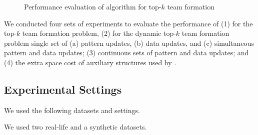 \begin{figure}[tb!]
\begin{center}
\hspace{0.2ex}
\vspace{-2.0ex}
\end{center}

\vspace{-3ex}
\caption{Performance evaluation of algorithm \optgrouprec for top-$k$ team formation}
\label{exp-semantic-effectiveness-citation}
\vspace{-3.0ex}
\end{figure}

We conducted four sets of experiments to evaluate the performance of
(1) \optgrouprec for the top-$k$ team formation problem,
(2) \inc for the dynamic top-$k$ team formation problem
\wrt single set of (a) pattern updates, (b) data updates, and (c) simultaneous pattern and data updates;
(3) \inc \wrt continuous sets of pattern and data updates; and
(4) the extra space cost of auxiliary structures used by \inc.


\subsection{Experimental Settings}

 We used the following datasets and settings.

\vspace{-0.3ex}
 We used two real-life and a synthetic datasets.

